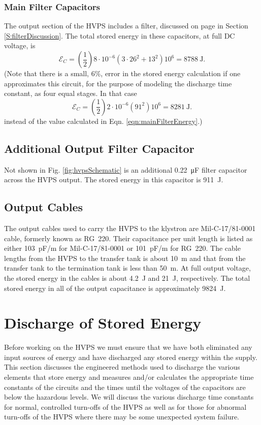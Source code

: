 \documentclass[letterpaper,11pt]{article}
\begin{document}
\subsubsection{Main Filter Capacitors}
The output section of the HVPS includes a filter, discussed on page \pageref{S:filterDiscussion} in Section \ref{S:filterDiscussion}.  The total stored energy in these capacitors, at full DC voltage, is
\begin{equation}\label{eqn:mainFilterEnergy}
	\mathcal{E}_{C} = \left(\dfrac{1}{2}\right)8\cdot 10^{-6}\left(3\cdot 26^{2} + 13^{2}\right)10^{6} = \SI{8788}{\joule}.
\end{equation}
(Note that there is a small, $6\%$, error in the stored energy calculation if one approximates this circuit, for the purpose of modeling the discharge time constant, as four equal stages.  In that case
\begin{equation}\label{eqn:mainFilterEnergyApprox}
	\mathcal{E}_{C} = \left(\dfrac{1}{2}\right)2\cdot 10^{-6}\left(91^{2}\right)10^{6} = \SI{8281}{\joule}.
\end{equation}
instead of the value calculated in Eqn. \ref{eqn:mainFilterEnergy}.)
\subsection{Additional Output Filter Capacitor}
Not shown in Fig. \ref{fig:hvpsSchematic} is an additional \SI{0.22}{\micro\farad} filter capacitor across the HVPS output.  The stored energy in this capacitor is \SI{911}{\joule}.
\subsection{Output Cables}
The output cables used to carry the HVPS to the klystron are Mil-C-17/81-0001 cable, formerly known as RG~220.  Their capacitance per unit length is listed as either \SI{103}{\pF/\meter} for Mil-C-17/81-0001 or \SI{101}{\pF/\meter} for RG~220.  The cable lengths from the HVPS to the transfer tank is about \SI{10}{\meter} and that from the transfer tank to the termination tank is less than \SI{50}{\meter}.  At full output voltage, the stored energy in the cables is about \SI{4.2}{\joule} and \SI{21}{\joule}, respectively.  The total stored energy in all of the output capacitance is approximately \SI{9824}{\joule}.

\section{Discharge of Stored Energy}
Before working on the HVPS we must ensure that we have both eliminated any input sources of energy and have discharged any stored energy within the supply.  This section discusses the engineered methods used to discharge the various elements that store energy and measures and/or calculates the appropriate time constants of the circuits and the times until the voltages of the capacitors are below the hazardous levels.  We will discuss the various discharge time constants for normal, controlled turn-offs of the HVPS as well as for those for abnormal turn-offs of the HVPS where there may be some unexpected system failure.
\end{document}
